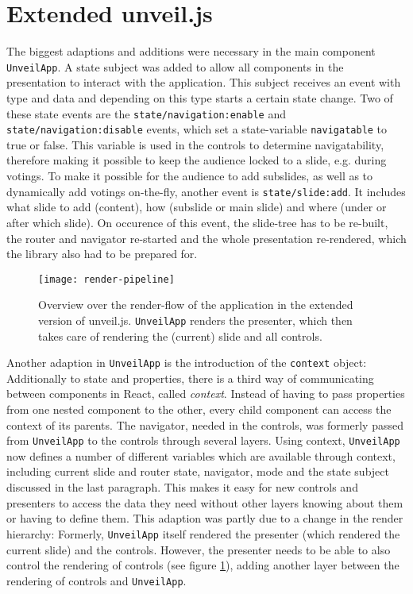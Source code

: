 \section{Extended unveil.js}
\label{sec:implementation-unveil}
The biggest adaptions and additions were necessary in the main component \texttt{UnveilApp}. A state subject was added to allow all components in the presentation to interact with the application. This subject receives an event with type and data and depending on this type starts a certain state change. Two of these state events are the \texttt{state/navigation:enable} and \texttt{state/navigation:disable} events, which set a state-variable \texttt{navigatable} to true or false. This variable is used in the controls to determine navigatability, therefore making it possible to keep the audience locked to a slide, e.g. during votings.
To make it possible for the audience to add subslides, as well as to dynamically add votings on-the-fly, another event is \texttt{state/slide:add}. It includes what slide to add (content), how (subslide or main slide) and where (under or after which slide). On occurence of this event, the slide-tree has to be re-built, the router and navigator re-started and the whole presentation re-rendered, which the library also had to be prepared for.

\begin{figure}
\centering
\texttt{[image: render-pipeline]}
\caption{Overview over the render-flow of the application in the extended version of unveil.js. \texttt{UnveilApp} renders the presenter, which then takes care of rendering the (current) slide and all controls.}
\label{fig:implementation-unveil-render-pipeline}
\end{figure}

Another adaption in \texttt{UnveilApp} is the introduction of the \texttt{context} object: Additionally to state and properties, there is a third way of communicating between components in React, called \emph{context}. Instead of having to pass properties from one nested component to the other, every child component can access the context of its parents. The navigator, needed in the controls, was formerly passed from \texttt{UnveilApp} to the controls through several layers. Using context, \texttt{UnveilApp} now defines a number of different variables which are available through context, including current slide and router state, navigator, mode and the state subject discussed in the last paragraph. This makes it easy for new controls and presenters to access the data they need without other layers knowing about them or having to define them.
This adaption was partly due to a change in the render hierarchy: Formerly, \texttt{UnveilApp} itself rendered the presenter (which rendered the current slide) and the controls. However, the presenter needs to be able to also control the rendering of controls (see figure \ref{fig:implementation-unveil-render-pipeline}), adding another layer between the rendering of controls and \texttt{UnveilApp}.

